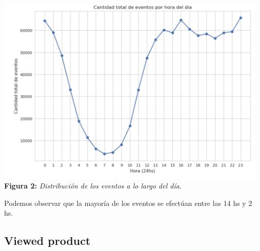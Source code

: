 \documentclass[titlepage,a4paper]{article}
\begin{document}
	\begin{center}
	\includegraphics[width=13cm]{cantidadDeEventosPorHoraDelDia.jpg}\\
	\textbf{Figura 2:}  \textit{Distribución de los eventos a lo largo del día.}
	\end{center}
	Podemos observar que la mayoría de los eventos se efectúan entre las 14 hs y 2 hs. \\
	\subsection{Viewed product}
\end{document}
